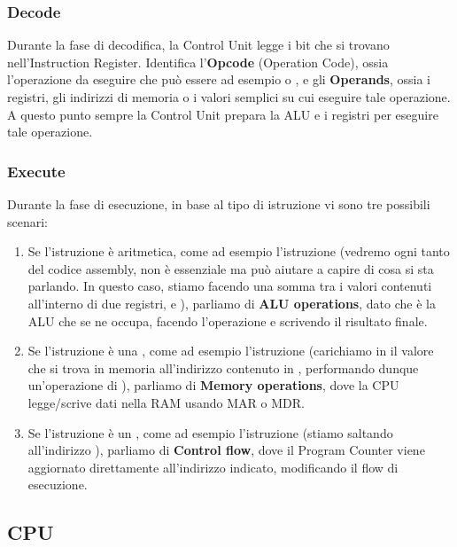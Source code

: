 \documentclass[11pt, a4paper, titlepage, oneside]{scrbook}
\begin{document}
\subsubsection*{Decode}

Durante la fase di decodifica, la Control Unit legge i bit che si trovano nell'Instruction Register. Identifica l'\textbf{Opcode} (Operation Code), ossia l'operazione da eseguire che può essere ad esempio  o , e gli \textbf{Operands}, ossia i registri, gli indirizzi di memoria o i valori semplici su cui eseguire tale operazione. A questo punto sempre la Control Unit prepara la ALU e i registri per eseguire tale operazione.

\subsubsection*{Execute}

Durante la fase di esecuzione, in base al tipo di istruzione vi sono tre possibili scenari:
\begin{enumerate}
    \item Se l'istruzione è aritmetica, come ad esempio l'istruzione  (vedremo ogni tanto del codice assembly, non è essenziale ma può aiutare a capire di cosa si sta parlando. In questo caso, stiamo facendo una somma tra i valori contenuti all'interno di due registri,  e ), parliamo di \textbf{ALU operations}, dato che è la ALU che se ne occupa, facendo l'operazione e scrivendo il risultato finale.
    \item Se l'istruzione è una , come ad esempio l'istruzione  (carichiamo in  il valore che si trova in memoria all'indirizzo contenuto in , performando dunque un'operazione di ), parliamo di \textbf{Memory operations}, dove la CPU legge/scrive dati nella RAM usando MAR o MDR.
    \item Se l'istruzione è un , come ad esempio l'istruzione  (stiamo saltando all'indirizzo ), parliamo di \textbf{Control flow}, dove il Program Counter viene aggiornato direttamente all'indirizzo indicato, modificando il flow di esecuzione.
\end{enumerate}

\subsection{CPU}
\end{document}
